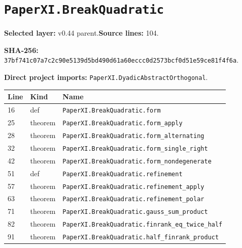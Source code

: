 \documentclass[10pt,oneside]{book}
\begin{document}
\section{\texorpdfstring{\nolinkurl{PaperXI.BreakQuadratic}}{PaperXI.BreakQuadratic}}\label{module:PaperXI.BreakQuadratic}

\textbf{Selected layer:} v0.44 parent.\quad\textbf{Source lines:} 104.\par\textbf{SHA-256:} {\scriptsize\nolinkurl{37bf741c07a7c2c90e5139d5bd490d61a60eccc0d2573bcf0d51e59ce81f4f6a}}.


\textbf{Direct project imports:} \nolinkurl{PaperXI.DyadicAbstractOrthogonal}.

\begin{longtable}{@{}p{}p{}p{}@{}}\toprule Line&Kind&Name\\\midrule\endhead

16&def&\nolinkurl{PaperXI.BreakQuadratic.form}\\

25&theorem&\nolinkurl{PaperXI.BreakQuadratic.form_apply}\\

28&theorem&\nolinkurl{PaperXI.BreakQuadratic.form_alternating}\\

32&theorem&\nolinkurl{PaperXI.BreakQuadratic.form_single_right}\\

42&theorem&\nolinkurl{PaperXI.BreakQuadratic.form_nondegenerate}\\

51&def&\nolinkurl{PaperXI.BreakQuadratic.refinement}\\

57&theorem&\nolinkurl{PaperXI.BreakQuadratic.refinement_apply}\\

63&theorem&\nolinkurl{PaperXI.BreakQuadratic.refinement_polar}\\

71&theorem&\nolinkurl{PaperXI.BreakQuadratic.gauss_sum_product}\\

82&theorem&\nolinkurl{PaperXI.BreakQuadratic.finrank_eq_twice_half}\\

91&theorem&\nolinkurl{PaperXI.BreakQuadratic.half_finrank_product}\\

\bottomrule\end{longtable}
\end{document}
